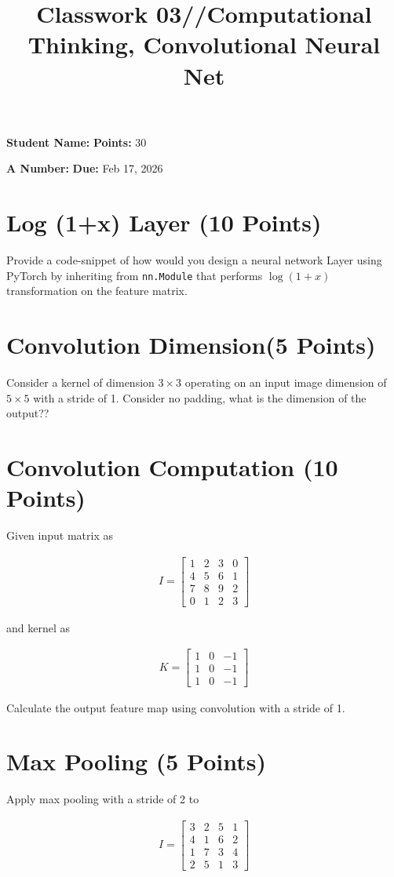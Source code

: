 \documentclass[12pt, xcolor=dvipsnames,svgnames,x11names]{article}
\makeatletter
\renewcommand{\maketitle}{%
    \vspace*{0.2cm}
    \begin{center}
        \begin{tcolorbox}[
            enhanced,
            colback=white,
            colframe=headerRed,
            arc=0mm,
            title={\textcolor{white}{\bfseries \@title}},
            coltitle=white,
            fonttitle=\bfseries\large,
            attach boxed title to top left={xshift=10pt, yshift=-\tcboxedtitleheight/2},
            boxed title style={sharp corners, colback=headerRed, frame hidden}
        ]
        \large
        \vspace{10pt}
        \noindent \textbf{Student Name:} \underline{\hspace{7cm}} \hfill \textbf{Points:} 30
        
        \vspace{10pt}
        \noindent \textbf{A Number:} \hfill \underline{\hspace{7cm}} \hfill \textbf{Due:} Feb 17, 2026
        \end{tcolorbox}
    \end{center}
    \vspace{10pt}
}
\newcommand{\hw}{Classwork 03//Computational Thinking, Convolutional Neural Net}
\makeatother
\begin{document}
\title{\hw}
\maketitle




\section{Log (1+x) Layer \hfill \textbf{(10 Points)}}

Provide a code-snippet of how would you design a neural network Layer using PyTorch by inheriting from \texttt{nn.Module} that performs $\log(1+x)$ transformation on the feature matrix.

\section{Convolution Dimension\hfill \textbf{(5 Points)}}

Consider a kernel of dimension $3\times 3$ operating on an input image dimension of $5\times 5$ with a stride of 1. Consider no padding, what is the dimension of the output??

\section{Convolution Computation \hfill \textbf{(10 Points)}}

Given input matrix  as

\begin{align*}
I = \begin{bmatrix}
1 & 2 & 3 & 0 \\
     4 & 5 & 6 & 1\\
     7 & 8 & 9 & 2\\
     0 & 1 & 2 & 3
\end{bmatrix}
\end{align*}

and kernel as

\begin{align*}
K = \begin{bmatrix}
1 & 0 & -1\\
    1 & 0 & -1\\
     1 & 0 & -1
\end{bmatrix}
\end{align*}

Calculate the output feature map using convolution with a stride of 1.

\section{Max Pooling \hfill \textbf{(5 Points)}}
Apply max pooling with a stride of 2 to 

\begin{align*}
I = \begin{bmatrix}
 3 & 2 & 5 & 1\\
     4 & 1 & 6 & 2\\
     1 & 7 & 3 & 4\\
     2 & 5 & 1 & 3
\end{bmatrix}
\end{align*}
\end{document}
